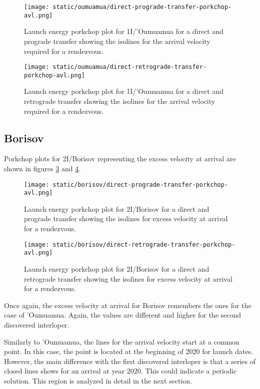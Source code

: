 \newpage
\begin{figure}[H]
  \centering
  \texttt{[image: static/oumuamua/direct-prograde-transfer-porkchop-avl.png]}
  \caption[Direct and prograde launch energy porkchop for 'Oumuamua]{Launch energy porkchop plot for 1I/'Oumuamua for a direct and prograde transfer showing the isolines for the arrival velocity required for a rendezvous.}
  \label{fig:oumuamua-direct-prograde-transfer-porkchop-avl}
\end{figure}

\begin{figure}[H]
  \centering
  \texttt{[image: static/oumuamua/direct-retrograde-transfer-porkchop-avl.png]}
  \caption[Direct and prograde launch energy porkchop for
    'Oumuamua]{Launch energy porkchop plot for 1I/'Oumuamua for a direct and
    retrograde transfer showing the isolines for the arrival velocity required for a rendezvous.}
  \label{fig:oumuamua-direct-retrograde-transfer-porkchop-avl}
\end{figure}

\subsection{Borisov}

Porkchop plots for 2I/Borisov representing the excess velocity at arrival are
shown in figures \ref{fig:borisov-direct-prograde-transfer-porkchop-avl} and
\ref{fig:borisov-direct-retrograde-transfer-porkchop-avl}.

\begin{figure}[H]
  \centering
  \texttt{[image: static/borisov/direct-prograde-transfer-porkchop-avl.png]}
  \caption[Direct and prograde arrival excess velocity porkchop for
    Borisov]{Launch energy porkchop plot for 2I/Borisov for a direct and
    prograde transfer showing the isolines for excess velocity at arrival
    for a rendezvous.}
  \label{fig:borisov-direct-prograde-transfer-porkchop-avl}
\end{figure}

\begin{figure}[H]
  \centering
  \texttt{[image: static/borisov/direct-retrograde-transfer-porkchop-avl.png]}
  \caption[Direct and retrograde arrival excess velocity porkchop for
    Borisov]{Launch energy porkchop plot for 2I/Borisov for a direct and
    retrograde transfer showing the isolines for excess velocity at arrival
    for a rendezvous.}
  \label{fig:borisov-direct-retrograde-transfer-porkchop-avl}
\end{figure}

Once again, the excess velocity at arrival for Borisov remembers the ones for
the case of 'Oumuamua. Again, the values are different and higher for the second
discovered interloper.

Similarly to 'Oumuamua, the lines for the arrival velocity start at a common
point. In this case, the point is located at the beginning of 2020 for launch
dates. However, the main difference with the first discovered interloper is that
a series of closed lines shows for an arrival at year 2020. This could indicate
a periodic solution. This region is analyzed in detail in the next section.
